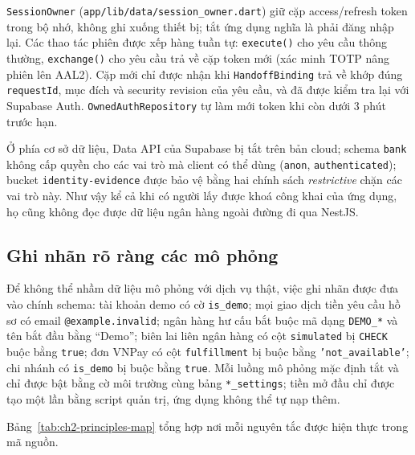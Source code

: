 \texttt{SessionOwner} (\texttt{app/\allowbreak{}lib/\allowbreak{}data/\allowbreak{}session\_\allowbreak{}owner.\allowbreak{}dart}) giữ cặp access/refresh token trong bộ nhớ, không ghi xuống thiết bị; tắt ứng dụng nghĩa là phải đăng nhập lại. Các thao tác phiên được xếp hàng tuần tự: \texttt{execute()} cho yêu cầu thông thường, \texttt{exchange()} cho yêu cầu trả về cặp token mới (xác minh TOTP nâng phiên lên AAL2). Cặp mới chỉ được nhận khi \texttt{Handoff\allowbreak{}Binding} trả về khớp đúng \texttt{requestId}, mục đích và security revision của yêu cầu, và đã được kiểm tra lại với Supabase Auth. \texttt{Owned\allowbreak{}Auth\allowbreak{}Repository} tự làm mới token khi còn dưới 3 phút trước hạn.

Ở phía cơ sở dữ liệu, Data API của Supabase bị tắt trên bản cloud; schema \texttt{bank} không cấp quyền cho các vai trò mà client có thể dùng (\texttt{anon}, \texttt{authenticated}); bucket \texttt{identity-\allowbreak{}evidence} được bảo vệ bằng hai chính sách \emph{restrictive} chặn các vai trò này. Như vậy kể cả khi có người lấy được khoá công khai của ứng dụng, họ cũng không đọc được dữ liệu ngân hàng ngoài đường đi qua NestJS.

\subsection{Ghi nhãn rõ ràng các mô phỏng}
\label{sec:ch2-labelling}

Để không thể nhầm dữ liệu mô phỏng với dịch vụ thật, việc ghi nhãn được đưa vào chính schema: tài khoản demo có cờ \texttt{is\_\allowbreak{}demo}; mọi giao dịch tiền yêu cầu hồ sơ có email \texttt{@example.\allowbreak{}invalid}; ngân hàng hư cấu bắt buộc mã dạng \texttt{DEMO\_\allowbreak{}*} và tên bắt đầu bằng ``Demo''; biên lai liên ngân hàng có cột \texttt{simulated} bị \texttt{CHECK} buộc bằng \texttt{true}; đơn VNPay có cột \texttt{fulfillment} bị buộc bằng \texttt{'not\_\allowbreak{}available'}; chi nhánh có \texttt{is\_\allowbreak{}demo} bị buộc bằng \texttt{true}. Mỗi luồng mô phỏng mặc định tắt và chỉ được bật bằng cờ môi trường cùng bảng \texttt{*\_\allowbreak{}settings}; tiền mở đầu chỉ được tạo một lần bằng script quản trị, ứng dụng không thể tự nạp thêm.

Bảng~\ref{tab:ch2-principles-map} tổng hợp nơi mỗi nguyên tắc được hiện thực trong mã nguồn.

